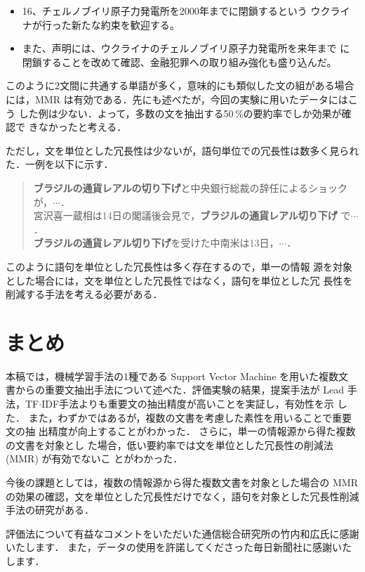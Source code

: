 \begin{itemize}
 \item 16、チェルノブイリ原子力発電所を2000年までに閉鎖するという
       ウクライナが行った新たな約束を歓迎する。
 \item また、声明には、ウクライナのチェルノブイリ原子力発電所を来年まで
       に閉鎖することを改めて確認、金融犯罪への取り組み強化も盛り込んだ。
\end{itemize}

このように2文間に共通する単語が多く，意味的にも類似した文の組がある場合
には，MMR は有効である．先にも述べたが，今回の実験に用いたデータにはこう
した例は少ない．よって，多数の文を抽出する50\,\%の要約率でしか効果が確認で
きなかったと考える．

ただし，文を単位とした冗長性は少ないが，語句単位での冗長性は数多く見られ
た．一例を以下に示す．

\begin{quote}
 {\bf ブラジルの通貨レアルの切り下げ}と中央銀行総裁の辞任によるショック
 が，$\cdots$．\\
 宮沢喜一蔵相は14日の閣議後会見で，{\bf ブラジルの通貨レアル切り下げ}
 で$\cdots$．\\
 {\bf ブラジルの通貨レアル切り下げ}を受けた中南米は13日，$\cdots$．
\end{quote}

\noindent このように語句を単位とした冗長性は多く存在するので，単一の情報
源を対象とした場合には，文を単位とした冗長性ではなく，語句を単位とした冗
長性を削減する手法を考える必要がある．

\section{まとめ}

本稿では，機械学習手法の1種である Support Vector Machine を用いた複数文
書からの重要文抽出手法について述べた．評価実験の結果，提案手法が Lead 手
法，TF$\cdot$IDF手法よりも重要文の抽出精度が高いことを実証し，有効性を示
した．
また，わずかではあるが，複数の文書を考慮した素性を用いることで重要文の抽
出精度が向上することがわかった．
さらに，単一の情報源から得た複数の文書を対象とし
た場合，低い要約率では文を単位とした冗長性の削減法 (MMR) が有効でないこ
とがわかった．

今後の課題としては，複数の情報源から得た複数文書を対象とした場合の MMR
の効果の確認，文を単位とした冗長性だけでなく，語句を対象とした冗長性削減
手法の研究がある．

\acknowledgment

評価法について有益なコメントをいただいた通信総合研究所の竹内和広氏に感謝
いたします．
また，データの使用を許諾してくださった毎日新聞社に感謝いたします．


